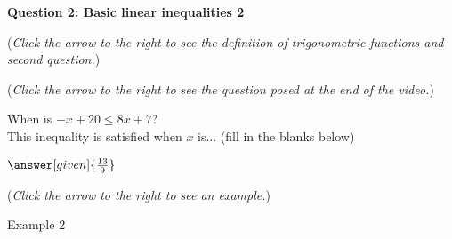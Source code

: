 \documentclass{ximera}
\begin{document}
\textbf{Question 2: Basic linear inequalities 2}
\begin{question}
\begin{flushright}
{\color{blue}(\emph{Click the arrow to the right to see the definition
of trigonometric functions and second question.})}
\end{flushright}
\begin{center}
\begin{expandable}
\begin{flushright}
{\color{blue}(\emph{Click the arrow to the right to see the question
posed at the end of the video.})}
\end{flushright}
\begin{expandable}
When is $-x+20\leq 8x+7$?\\ This inequality is satisfied when $x$ is... (fill in the blanks below)
\begin{prompt}  $\answer[given]{\frac{13}{9}}$
\end{prompt}
\begin{flushright}
{\color{blue}(\emph{Click the arrow to the right to see an example.})}
\end{flushright}
\begin{expandable}
\begin{center}
Example 2
\end{center}
\end{expandable}
\end{expandable}
\end{expandable}
\end{center}
\end{question}
\end{document}
